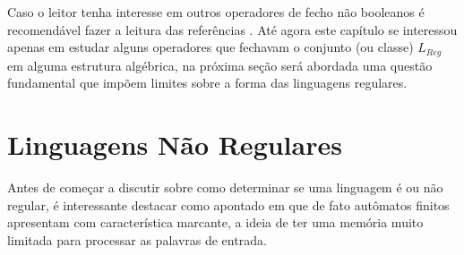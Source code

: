 Caso o leitor tenha interesse em outros operadores de fecho não booleanos é recomendável fazer a leitura das referências \cite{benjaLivro2010, carroll1989}. Até agora este capítulo se interessou apenas em estudar alguns operadores que fechavam o conjunto (ou classe) $L_{Reg}$ em alguma estrutura algébrica, na próxima seção será abordada uma questão fundamental que impõem limites sobre a forma das linguagens regulares.

\section{Linguagens Não Regulares}

Antes de começar a discutir sobre como determinar se uma linguagem é ou não regular, é interessante destacar como apontado em \cite{benjaLivro2010, linz2006, menezes1998LFA} que de fato autômatos finitos apresentam com característica marcante, a ideia de ter uma memória muito limitada para processar as palavras de entrada.